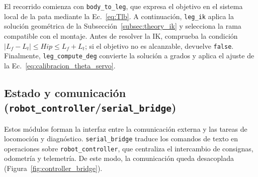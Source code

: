 El recorrido comienza con \texttt{body\_to\_leg}, que expresa el objetivo en el
sistema local de la pata mediante la Ec.~\ref{eq:Tlb}. A continuación,
\texttt{leg\_ik} aplica la solución geométrica de la
Subsección~\ref{subsec:theory_ik} y selecciona la rama compatible con el
montaje. Antes de resolver la IK, comprueba la condición
$|L_f-L_t|\leq Hip\leq L_f+L_t$; si el objetivo no es alcanzable, devuelve
\texttt{false}. Finalmente, \texttt{leg\_compute\_deg} convierte la solución a grados y aplica
el ajuste de la Ec.~\ref{eq:calibracion_theta_servo}.

\vspace{-0.5\baselineskip}
\subsection{Estado y comunicación
(\texttt{robot\_controller}/\texttt{serial\_bridge})}
\label{subsec:controller_bridge}
\label{subsec:robot_controller}
\label{subsec:serial_bridge}

Estos módulos forman la interfaz entre la comunicación externa y las tareas de
locomoción y diagnóstico. \texttt{serial\_bridge} traduce los comandos de texto
en operaciones sobre \texttt{robot\_controller}, que centraliza el intercambio
de consignas, odometría y telemetría. De este modo, la comunicación queda
desacoplada (Figura~\ref{fig:controller_bridge}).


